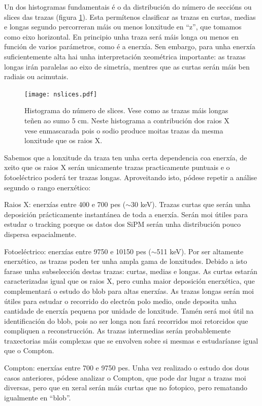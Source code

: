 \documentclass[a4paper,12pt]{article}
\begin{document}
Un dos histogramas fundamentais é o da distribución do número de seccións ou slices das trazas (figura \ref{nslices}). Esta permítenos clasificar as trazas en curtas, medias e longas segundo percorreran máis ou menos lonxitude en ``z'', que tomamos como eixo horizontal. En principio unha traza será máis longa ou menos en función de varios parámetros, como é a enerxía. Sen embargo, para unha enerxía suficientemente alta hai unha interpretación xeométrica importante: as trazas longas irán paralelas ao eixo de simetría, mentres que as curtas serán máis ben radiais ou acimutais. 

\begin{figure}[!]
\centering
\texttt{[image: nslices.pdf]}
\caption{Histograma do número de slices. Vese como as trazas máis longas teñen ao sumo 5 cm. Neste histograma a contribución dos raios X vese enmascarada pois o sodio produce moitas trazas da mesma lonxitude que os raios X.}
\label{nslices}
\end{figure}

Sabemos que a lonxitude da traza ten unha certa dependencia coa enerxía, de xeito que os raios X serán unicamente trazas practicamente puntuais e o fotoeléctrico poderá ter trazas longas. Aproveitando isto, pódese repetir a análise segundo o rango enerxético:

\bi
\item Raios X: enerxías entre 400 e 700 pes ($\sim$30 keV). Trazas curtas que serán unha deposición prácticamente instantánea de toda a enerxía. Serán moi útiles para estudar o tracking porque os datos dos SiPM serán unha distribución pouco dispersa espacialmente. %
\item Fotoeléctrico: enerxías entre 9750 e 10150 pes ($\sim$511 keV). Por ser altamente enerxético, as trazas poden ter unha ampla gama de lonxitudes. Debido a isto farase unha subselección destas trazas: curtas, medias e longas. As curtas estarán caracterizadas igual que os raios X, pero cunha maior deposición enerxética, que complementará o estudo do blob para altas enerxías. As trazas longas serán moi útiles para estudar o recorrido do electrón polo medio, onde deposita unha cantidade de enerxía pequena por unidade de lonxitude. Tamén será moi útil na identificación do blob, pois ao ser longa non fará recorridos moi retorcidos que compliquen a reconstrucción. As trazas intermedias serán probablemente traxectorias máis complexas que se envolven sobre si mesmas e estudaríanse igual que o Compton.
\item  Compton: enerxías entre  700 e 9750 pes. Unha vez realizado o estudo dos dous casos anteriores, pódese analizar o Compton, que pode dar lugar a trazas moi diversas, pero que en xeral serán máis curtas que no fotopico, pero rematando igualmente en ``blob''.
\ei
\end{document}
